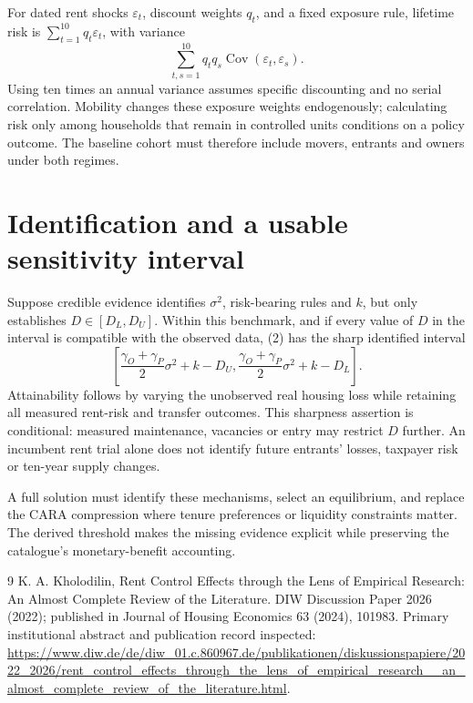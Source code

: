 \documentclass[11pt]{article}
\begin{document}
For dated rent shocks $\varepsilon_t$, discount weights $q_t$, and a fixed exposure rule, lifetime risk is $\sum_{t=1}^{10}q_t\varepsilon_t$, with variance
\[
 \sum_{t,s=1}^{10}q_tq_s\operatorname{Cov}(\varepsilon_t,\varepsilon_s).
\]
Using ten times an annual variance assumes specific discounting and no serial correlation. Mobility changes these exposure weights endogenously; calculating risk only among households that remain in controlled units conditions on a policy outcome. The baseline cohort must therefore include movers, entrants and owners under both regimes.

\section*{Identification and a usable sensitivity interval}
Suppose credible evidence identifies $\sigma^2$, risk-bearing rules and $k$, but only establishes $D\in[D_L,D_U]$. Within this benchmark, and if every value of $D$ in the interval is compatible with the observed data, (2) has the sharp identified interval
\[
 \left[\frac{\gamma_O+\gamma_P}{2}\sigma^2+k-D_U,
       \frac{\gamma_O+\gamma_P}{2}\sigma^2+k-D_L\right].
\]
Attainability follows by varying the unobserved real housing loss while retaining all measured rent-risk and transfer outcomes. This sharpness assertion is conditional: measured maintenance, vacancies or entry may restrict $D$ further. An incumbent rent trial alone does not identify future entrants' losses, taxpayer risk or ten-year supply changes.

A full solution must identify these mechanisms, select an equilibrium, and replace the CARA compression where tenure preferences or liquidity constraints matter. The derived threshold makes the missing evidence explicit while preserving the catalogue's monetary-benefit accounting.
\begin{thebibliography}{9}
 K. A. Kholodilin, Rent Control Effects through the Lens of Empirical Research: An Almost Complete Review of the Literature. DIW Discussion Paper 2026 (2022); published in Journal of Housing Economics 63 (2024), 101983. Primary institutional abstract and publication record inspected:
\url{https://www.diw.de/de/diw_01.c.860967.de/publikationen/diskussionspapiere/2022_2026/rent_control_effects_through_the_lens_of_empirical_research__an_almost_complete_review_of_the_literature.html}.
\end{thebibliography}
\end{document}
